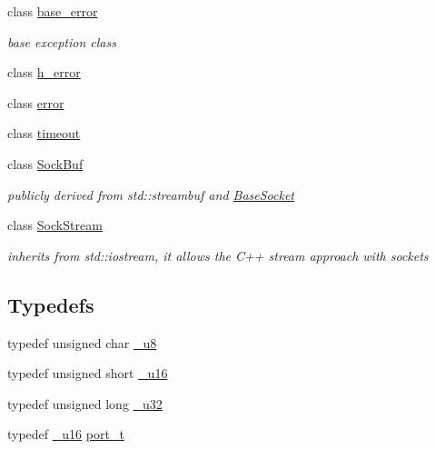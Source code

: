 \begin{CompactItemize}
class \hyperlink{classsocketpp_1_1base__error}{base\_\-error}
\begin{CompactList}\small\item\em base exception class \item\end{CompactList}\item 
class \hyperlink{classsocketpp_1_1h__error}{h\_\-error}
\item 
class \hyperlink{classsocketpp_1_1error}{error}
\item 
class \hyperlink{classsocketpp_1_1timeout}{timeout}
\item 
class \hyperlink{classsocketpp_1_1SockBuf}{SockBuf}
\begin{CompactList}\small\item\em publicly derived from std::streambuf and \hyperlink{classsocketpp_1_1BaseSocket}{BaseSocket} \item\end{CompactList}\item 
class \hyperlink{classsocketpp_1_1SockStream}{SockStream}
\begin{CompactList}\small\item\em inherits from std::iostream, it allows the C++ stream approach with sockets \item\end{CompactList}\end{CompactItemize}
\subsection*{Typedefs}
\begin{CompactItemize}
\item 
typedef unsigned char \hyperlink{namespacesocketpp_1398da7d8125cdb32e89041e5b0adb96}{\_\-u8}
\item 
typedef unsigned short \hyperlink{namespacesocketpp_0d48e817f00cbb84d07faec41ee4b169}{\_\-u16}
\item 
typedef unsigned long \hyperlink{namespacesocketpp_d9c3b2ad093bb5814af59760e0a2192a}{\_\-u32}
\item 
typedef \hyperlink{namespacesocketpp_0d48e817f00cbb84d07faec41ee4b169}{\_\-u16} \hyperlink{namespacesocketpp_5517ef80f249b891a2ba64b95fc1e723}{port\_\-t}
\end{CompactItemize}
